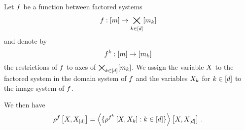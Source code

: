 \begin{theorem}\label{the:functionDecompositionBasisCP}
	Let $f$ be a function between factored systems
		\[ f : [m] \rightarrow  \bigtimes_{k\in[d]}[m_{k}] \]
	and denote by
		\[ f^k : [m] \rightarrow [m_{k}]\]
	the restrictions of $f$ to axes of $\bigtimes_{k\in[d]}[m_{k}]$.
	We assign the variable $X$ to the factored system in the domain system of $f$ and the variables $X_{k}$ for $k\in[d]$ to the image system of $f$.
	
	We then have
	\begin{align*}
		\rho^{f}\left[X,X_{[d]}\right]  
		= \left\langle 
		\{\rho^{f^{k}}\left[X,X_{k}\right] : k\in[d] \} 
		\right\rangle \left[ X,X_{[d]} \right] \, . 
	\end{align*}
\end{theorem}
